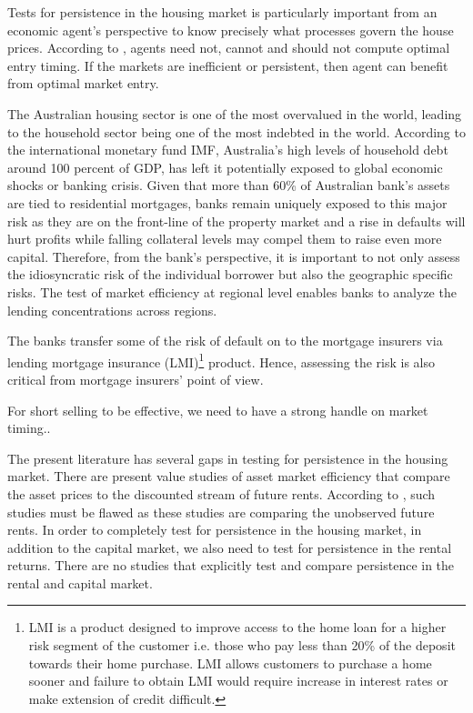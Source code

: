 \documentclass[AEJ,reqno, draftmode]{AEA}
\begin{document}
Tests for persistence in the housing market is particularly important from an economic agent's perspective to know precisely what processes govern the house prices. According to \cite{larsen2008testing}, agents need not, cannot and should not compute optimal entry timing. If the markets are inefficient or persistent, then agent can benefit from optimal market entry.



The Australian housing sector is one of the most overvalued in the world, leading to the household sector being one of the most indebted in the world. According to the international monetary fund IMF, Australia's high levels of household debt around 100 percent of GDP, has left it potentially exposed to global economic shocks or banking crisis. Given that more than 60\% of Australian bank's assets are tied to residential mortgages, banks remain uniquely exposed to this major risk as they are on the front-line of the property market and a rise in defaults will hurt profits while falling collateral levels may compel them to raise even more capital. Therefore, from the bank's perspective, it is important to not only assess the idiosyncratic risk of the individual borrower but also the geographic specific risks. The test of market efficiency at regional level enables banks to analyze the lending concentrations across regions.

The banks transfer some of the risk of default on to the mortgage insurers via lending mortgage insurance (LMI)\footnote{LMI is a product designed to improve access to the home loan for a higher risk segment of the customer i.e. those who pay less than 20\% of the deposit towards their home purchase. LMI allows customers to purchase a home sooner and failure to obtain LMI would require increase in interest rates or make extension of credit difficult.} product. Hence, assessing the risk is also critical from mortgage insurers' point of view.

For short selling to be effective, we need to have a strong handle on market timing..


The present literature has several gaps in testing for persistence in the housing market. %
There are present value studies of asset market efficiency that compare the asset prices to the discounted stream of future rents. According to \citet{rosenthal1999residential}, such studies must be flawed as these studies are comparing the unobserved future rents. In order to completely test for persistence in the housing market, in addition to the capital market, we also need to test for persistence in the rental returns. There are no studies that explicitly test and compare persistence in the rental and capital market. 
\end{document}
